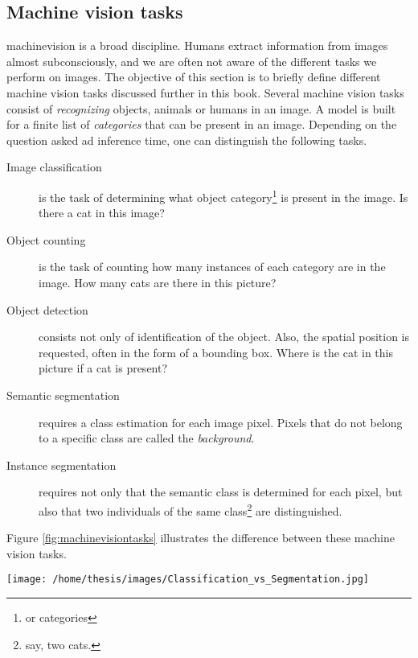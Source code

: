 \subsection{Machine vision tasks \label{sec:machinevisiontasks}}

\Gls{machinevision} is a broad discipline. 
Humans extract information from images almost subconsciously, and we are often not aware of the different tasks we perform on images.
The objective of this section is to briefly define different machine vision tasks discussed further in this book. 
Several machine vision tasks consist of \textit{recognizing} objects, animals or humans in an image.
A model is built for a finite list of \textit{categories} that can be present in an image.
Depending on the question asked ad inference time, one can distinguish the following tasks.

\begin{description}
    \item[Image classification] is the task of determining what object category\footnote{or categories} is present in the image. Is there a cat in this image?
    \item[Object counting] is the task of counting how many instances of each category are in the image. How many cats are there in this picture? 
    \item[Object detection] consists not only of identification of the object. Also, the spatial position is requested, often in the form of a bounding box. Where is the cat in this picture if a cat is present?
    \item[Semantic segmentation] requires a class estimation for each image pixel. Pixels that do not belong to a specific class are called the \textit{background}.
    \item[Instance segmentation] requires not only that the semantic class is determined for each pixel, but also that two individuals of the same class\footnote{say, two cats.} are distinguished.   
\end{description}

Figure \ref{fig:machinevisiontasks} illustrates the difference between these machine vision tasks. 

\begin{SCfigure}[][h!]
    \centering
    \texttt{[image: /home/thesis/images/Classification\_vs\_Segmentation.jpg]}
    \caption{Illustration to compare different Machine vision tasks \cite{SemTorch76:online}. 
    Object detection means that the location of several objects is estimated by the model. This is indicated by the \textit{bounding boxes}.
    Segmentation of an image is classifying each pixel in the correct class or assigning it to the \textit{background} class.
    Semantic segmentation makes no difference between different instances of the same semantic class, instance segmentation does.
    \label{fig:machinevisiontasks}}
\end{SCfigure}


